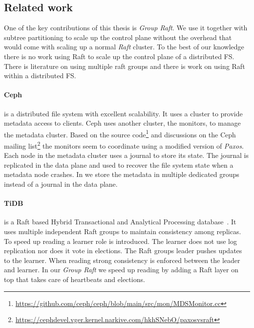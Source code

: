 \subsection{Related work} \label{sec:rel}
One of the key contributions of this thesis is \textit{Group Raft}. We use it together with subtree partitioning to scale up the control plane without the overhead that would come with scaling up a normal \textit{Raft} cluster. To the best of our knowledge there is no work using Raft to scale up the control plane of a distributed FS. There is literature on using multiple raft groups and there is work on using Raft within a distributed FS.
%
\paragraph{Ceph} is a distributed file system with excellent scalability. It uses a cluster to provide metadata access to clients. Ceph uses another cluster, the monitors, to manage the metadata cluster. Based on the source code\footnote{\href{https://github.com/ceph/ceph/blob/main/src/mon/MDSMonitor.cc}{https://github.com/ceph/ceph/blob/main/src/mon/MDSMonitor.cc}} and discussions on the Ceph mailing list\footnote{\href{https://ceph\-devel.vger.kernel.narkive.com/hkhSNebO/paxos\-vs\-raft}{https://ceph\-devel.vger.kernel.narkive.com/hkhSNebO/paxos\-vs\-raft}} the monitors seem to coordinate using a modified version of \textit{Paxos}. Each node in the metadata cluster uses a journal to store its state. The journal is replicated in the data plane and used to recover the file system state when a metadata node crashes. In \name{} we store the metadata in multiple  dedicated groups instead of a journal in the data plane.
%
\paragraph{TiDB} is a Raft based Hybrid Transactional and Analytical Processing database~\cite{tidb}. It uses multiple independent Raft groups to maintain consistency among replicas. To speed up reading a learner role is introduced. The learner does not use log replication nor does it vote in elections. The Raft groups leader pushes updates to the learner. When reading strong consistency is enforced between the leader and learner. In our \textit{Group Raft} we speed up reading by adding a Raft layer on top that takes care of heartbeats and elections.
%
